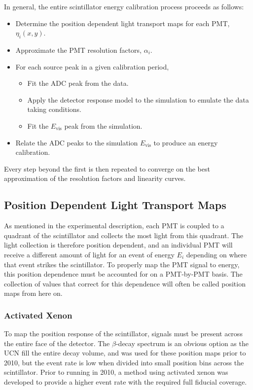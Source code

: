 In general, the entire scintillator energy calibration process proceeds as follows: 
\begin{itemize}
\item Determine the position dependent light transport maps for each PMT, $\eta_i(x,y)$.
\item Approximate the PMT resolution factors, $\alpha_i$.
\item For each source peak in a given calibration period,
  \begin{itemize}
  \item Fit the ADC peak from the data.
  \item Apply the detector response model to the simulation to emulate the data taking conditions.
  \item Fit the $E_{\mathrm{vis}}$ peak from the simulation.
  \end{itemize}
\item Relate the ADC peaks to the simulation $E_{\mathrm{vis}}$ to produce an energy calibration.
\end{itemize}
Every step beyond the first is then repeated to converge on the best approximation of the resolution factors
and linearity curves.


\subsection{Position Dependent Light Transport Maps} \label{ssec:posmaps}

As mentioned in the experimental description, each PMT is coupled to a quadrant of
the scintillator and collects the most light from this quadrant. The light collection
is therefore position dependent, and an individual PMT will receive a different
amount of light for an event of energy $E_i$ depending on where that event strikes
the scintillator. To properly map the PMT signal to energy, this position dependence
must be accounted for on a PMT-by-PMT basis. The collection of values that correct for this
dependence will often be called position maps from here on.


\subsubsection{Activated Xenon}

To map the position response of the scintillator, signals must be present across the
entire face of the detector. The $\beta$-decay spectrum
is an obvious option as the UCN fill the entire decay volume, and was used for these position maps prior to 2010,
but the event rate is low when divided into small position bins across the scintillator.
Prior to running in 2010, a method using activated xenon was developed to provide
a higher event rate with the required full fiducial coverage.

